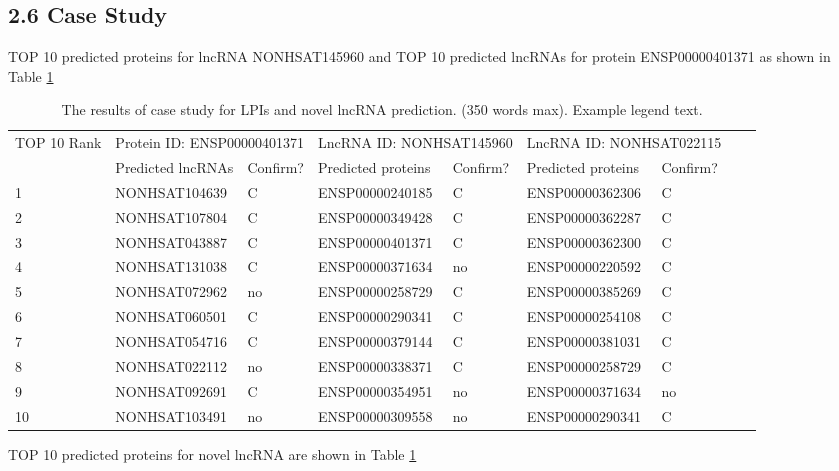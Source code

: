 \documentclass[fleqn,10pt]{wlscirep}
\begin{document}
\subsection*{2.6 Case Study}
TOP 10 predicted proteins for lncRNA NONHSAT145960 and TOP 10 predicted lncRNAs for protein ENSP00000401371 as shown in Table \ref{tab:caseStudy1}
\begin{table}[ht]
\centering
\caption{\label{tab:caseStudy1} The results of case study for LPIs and novel lncRNA prediction. (350 words max). Example legend text.}
\begin{tabular}{|l|l|l|l|l|l|l|l|l|}
\hline
\multirow{2}{*}{TOP 10 Rank} & \multicolumn{2}{|l|}{Protein ID: ENSP00000401371} & \multicolumn{2}{|l|}{LncRNA ID: NONHSAT145960}& \multicolumn{2}{|l|}{LncRNA ID: NONHSAT022115}\\
\cline{2-7}
 & Predicted lncRNAs & Confirm? & Predicted proteins & Confirm? & Predicted proteins & Confirm? \\
\hline
1 & NONHSAT104639  & C & ENSP00000240185 & C & ENSP00000362306 & C
\\
2 & NONHSAT107804 & C & ENSP00000349428	& C & ENSP00000362287 & 	C
\\
3 & NONHSAT043887  & C & ENSP00000401371	& C & ENSP00000362300 & 	C
\\
4 & NONHSAT131038  & C & ENSP00000371634	& no & ENSP00000220592  & C
\\
5 & NONHSAT072962  & no & ENSP00000258729 & C & ENSP00000385269  & C
\\
6 & NONHSAT060501  & C & ENSP00000290341	& C & ENSP00000254108  & C
\\
7 & NONHSAT054716 & C & ENSP00000379144 & C & ENSP00000381031 & C
\\
8 & NONHSAT022112 & no & ENSP00000338371 & C & ENSP00000258729 & C
\\
9 & NONHSAT092691 & C & ENSP00000354951	& no & ENSP00000371634 & no
\\
10 & NONHSAT103491 & no & ENSP00000309558 & no & ENSP00000290341  & C
\\
\hline
\end{tabular}
\end{table}

TOP 10 predicted proteins for novel lncRNA are shown in Table \ref{tab:caseStudy1}
\end{document}
